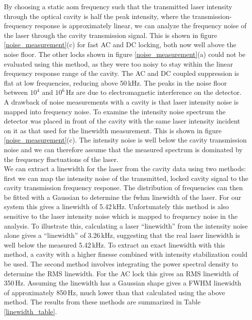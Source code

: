 \documentclass{article}
\begin{document}
\begin{multicols}{2}
By choosing a static \gls*{aom} frequency such that the transmitted laser intensity through the optical cavity is half the peak intensity, where the transmission-frequency response is approximately linear, we can analyze the frequency noise of the laser through the cavity transmission signal. This is shown in figure \ref{noise_measurement}(c) for fast AC and DC locking, both now well above the noise floor. The other locks shown in figure \ref{noise_measurement}(a) could not be evaluated using this method, as they were too noisy to stay within the linear frequency response range of the cavity. The AC and DC coupled suppression is flat at low frequencies, reducing above 50\,kHz. The peaks in the noise floor between $10^4$ and $10^6$\,Hz are due to electromagnetic interference on the detector. A drawback of noise measurements with a cavity is that laser intensity noise is mapped into frequency noise. To examine the intensity noise spectrum the detector was placed in front of the cavity with the same laser intensity incident on it as that used for the linewidth measurement. This is shown in figure \ref{noise_measurement}(c). The intensity noise is well below the cavity transmission noise and we can therefore assume that the measured spectrum is dominated by the frequency fluctuations of the laser.\\

We can extract a linewidth for the laser from the cavity data using two methods: first we can map the intensity noise of the transmitted, locked cavity signal to the cavity transmission frequency response. The distribution of frequencies can then be fitted with a Gaussian to determine the \gls*{fwhm} linewidth of the laser. For our system this gives a linewidth of 5.42\,kHz. Unfortunately this method is also sensitive to the laser intensity noise which is mapped to frequency noise in the analysis. To illustrate this, calculating a laser ``linewidth'' from the intensity noise alone gives a ``linewidth'' of 3.26\,kHz, suggesting that the real laser linewidth is well below the measured 5.42\,kHz. To extract an exact linewidth with this method, a cavity with a higher finesse combined with intensity stabilization could be used. The second method involves integrating the power spectral density to determine the RMS linewidth\cite{negnevitsky_wideband_2013}. For the AC lock this gives an RMS linewidth of 350\,Hz. Assuming the linewidth has a Gaussian shape gives a FWHM linewidth of approximately 850\,Hz, much lower than that calculated using the above method. The results from these methods are summarized in Table \ref{linewidth_table}.\\


\end{multicols}
\end{document}

